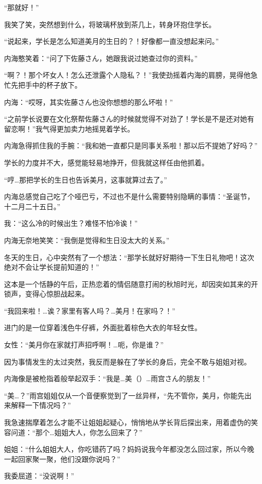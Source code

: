 “那就好！”

我笑了笑，突然想到什么，将玻璃杯放到茶几上，转身环抱住学长。

“说起来，学长是怎么知道美月的生日的？！好像都一直没想起来问。”

内海憨笑着：“问了下佐藤さん，她跟我说过她查过你的资料。”

“啊？！那个坏女人！怎么还泄露个人隐私？！”我使劲摇着内海的肩膀，晃得他急忙先把手中的杯子放下。

内海：“哎呀，其实佐藤さん也没你想想的那么坏啦！”

“之前学长说要在文化祭帮佐藤さん的时候就觉得不对劲了！学长是不是还对她有留恋啊！”我气得更加卖力地摇晃着学长。

内海急得抓住我的手腕：“我和她一直都只是同事关系啦！那以后不提她了好吗？”

学长的力度并不大，感觉能轻易地挣开，但我就这样任由他抓着。

“哼…那把学长的生日也告诉美月，这事就算过去了。”

内海总感觉自己吃了个哑巴亏，不过也不是什么需要特别隐瞒的事情：“圣诞节，十二月二十五日。”

我：“这么冷的时候出生？难怪不怕冷诶！”

内海无奈地笑笑：“我倒是觉得和生日没太大的关系。”

冬天的生日，心中突然有了一个想法：“那学长就好好期待一下生日礼物吧！这次绝对不会让学长提前知道的！”



这本是一个恬静的午后，正热恋着的情侣随意打闹的秋旭时光，却因突如其来的开锁声，变得心惊胆战起来。


“我回来啦！…诶？家里有客人吗？…美月！在家吗？！”


进门的是一位穿着浅色牛仔裤，外面批着棕色大衣的年轻女性。

女性：“美月你在家就打声招呼啊！…呃，你是谁？”

因为事情发生的太过突然，我反而是躲在了学长的身后，完全不敢与姐姐对视。

内海像是被枪指着般举起双手：“我是…美（）…雨宫さん的朋友！”

“美…？”雨宫姐姐仅从一个音便察觉到了一丝异样，“先不管你，美月，你能先出来解释一下情况吗？”

我急速揣摩着怎么才能不让姐姐起疑心，悄悄地从学长背后探出来，用着虚伪的笑容问道：“那个…姐姐大人，你怎么回来了？”

姐姐：“什么姐姐大人，你吃错药了吗？妈妈说我今年都没怎么回过家，所以今晚一起回家聚一聚，他们没跟你说吗？”

我委屈道：“没说啊！”

